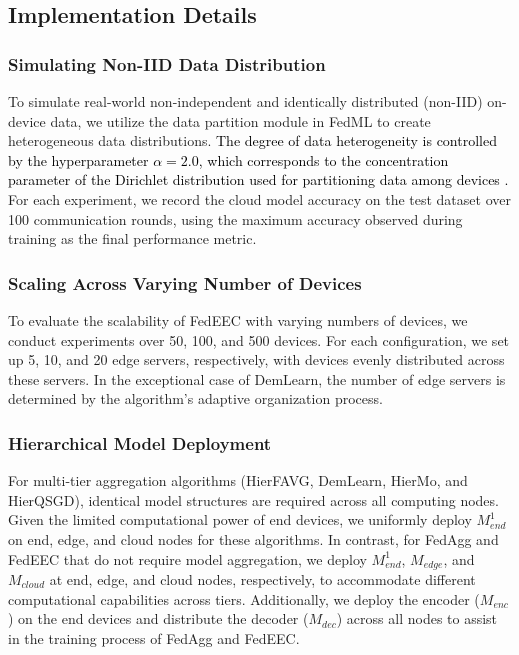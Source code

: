 \documentclass[10pt,journal]{IEEEtran}
\begin{document}
\subsection{Implementation Details}
\subsubsection{Simulating Non-IID Data Distribution}
To simulate real-world non-independent and identically distributed (non-IID) on-device data, we utilize the data partition module in FedML to create heterogeneous data distributions. \textcolor{black}{The degree of data heterogeneity is controlled by the hyperparameter $\alpha=2.0$, which corresponds to the concentration parameter of the Dirichlet distribution used for partitioning data among devices \cite{li2022federated}.} For each experiment, we record the cloud model accuracy on the test dataset over 100 communication rounds, using the maximum accuracy observed during training as the final performance metric.


\subsubsection{Scaling Across Varying Number of Devices}
To evaluate the scalability of FedEEC with varying numbers of devices, we conduct experiments over 50, 100, and 500 devices. For each configuration, we set up 5, 10, and 20 edge servers, respectively, with devices evenly distributed across these servers. In the exceptional case of DemLearn, the number of edge servers is determined by the algorithm’s adaptive organization process.


\subsubsection{Hierarchical Model Deployment}
For multi-tier aggregation algorithms (HierFAVG, DemLearn, HierMo, and HierQSGD), identical model structures are required across all computing nodes. Given the limited computational power of end devices, we uniformly deploy $M_{end}^1$ on end, edge, and cloud nodes for these algorithms. In contrast, for FedAgg and FedEEC that do not require model aggregation, we deploy $M_{end}^1$, $M_{edge}$, and $M_{cloud}$ at end, edge, and cloud nodes, respectively, to accommodate different computational capabilities across tiers. Additionally, we deploy the encoder ($M_{enc}$) on the end devices and distribute the decoder ($M_{dec}$) across all nodes to assist in the training process of FedAgg and FedEEC.
\end{document}
